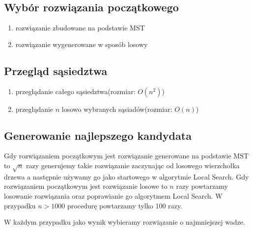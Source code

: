 \documentclass{article}
\begin{document}
\subsection*{Wybór rozwiązania początkowego}
\begin{enumerate}
    \item rozwiązanie zbudowane na podstawie MST
    \item rozwiązanie wygenerowane w sposób losowy
\end{enumerate}

\subsection*{Przegląd sąsiedztwa}
\begin{enumerate}
    \item przeglądanie całego sąsiedztwa(rozmiar: $O(n^2)$)
    \item przeglądanie $n$ losowo wybranych sąsiadów(rozmiar: $O(n)$)
\end{enumerate}

\subsection*{Generowanie najlepszego kandydata}
Gdy rozwiązaniem początkowym jest rozwiązanie generowane na podstawie MST to $\sqrt{n}$ razy 
generujemy takie rozwiązanie zaczynając od losowego wierzchołka drzewa a następnie 
używamy go jako startowego w algorytmie Local Search. \newline
Gdy rozwiązaniem początkowym jest rozwiązanie losowe to $n$ razy powtarzamy losowanie rozwiązania 
oraz poprawianie go algorytmem Local Search. W przypadku $n > 1000$ procedurę powtarzamy tylko 100 razy.

W każdym przypadku jako wynik wybieramy rozwiązanie o najmniejszej wadze.
\end{document}
